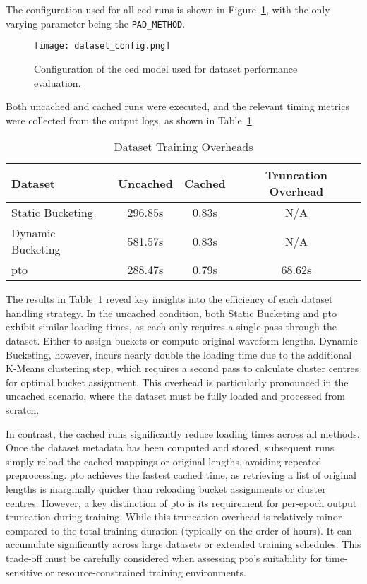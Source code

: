 The configuration used for all \gls{ced} runs is shown in Figure~\ref{fig:dataset_config}, with the only varying parameter being the \texttt{PAD\_METHOD}.

\begin{figure}[H]
    \centering
    \texttt{[image: dataset\_config.png]}
    \caption{\label{fig:dataset_config} Configuration of the \gls{ced} model used for dataset performance evaluation.}
\end{figure}

Both uncached and cached runs were executed, and the relevant timing metrics were collected from the output logs, as shown in Table~\ref{tab:dataset_loading_times}.

\vspace{1em}
\begin{table}[H]
\centering
\caption{Dataset Training Overheads}
\label{tab:dataset_loading_times}
\begin{tabular}{|l|c|c|c|}
\hline
\textbf{Dataset} & \textbf{Uncached} & \textbf{Cached} & \textbf{Truncation Overhead} \\
\hline
Static Bucketing  & 296.85s  & 0.83s   & N/A    \\
Dynamic Bucketing & 581.57s& 0.83s  & N/A    \\
\gls{pto}               & 288.47s & 0.79s  & 68.62s  \\
\hline
\end{tabular}
\end{table}

The results in Table~\ref{tab:dataset_loading_times} reveal key insights into the efficiency of each dataset handling strategy. In the uncached condition, both Static Bucketing and \gls{pto} exhibit similar loading times, as each only requires a single pass through the dataset. Either to assign buckets or compute original waveform lengths. Dynamic Bucketing, however, incurs nearly double the loading time due to the additional K-Means clustering step, which requires a second pass to calculate cluster centres for optimal bucket assignment. This overhead is particularly pronounced in the uncached scenario, where the dataset must be fully loaded and processed from scratch.

In contrast, the cached runs significantly reduce loading times across all methods. Once the dataset metadata has been computed and stored, subsequent runs simply reload the cached mappings or original lengths, avoiding repeated preprocessing. \gls{pto} achieves the fastest cached time, as retrieving a list of original lengths is marginally quicker than reloading bucket assignments or cluster centres. However, a key distinction of \gls{pto} is its requirement for per-epoch output truncation during training. While this truncation overhead is relatively minor compared to the total training duration (typically on the order of hours). It can accumulate significantly across large datasets or extended training schedules. This trade-off must be carefully considered when assessing \gls{pto}'s suitability for time-sensitive or resource-constrained training environments.

